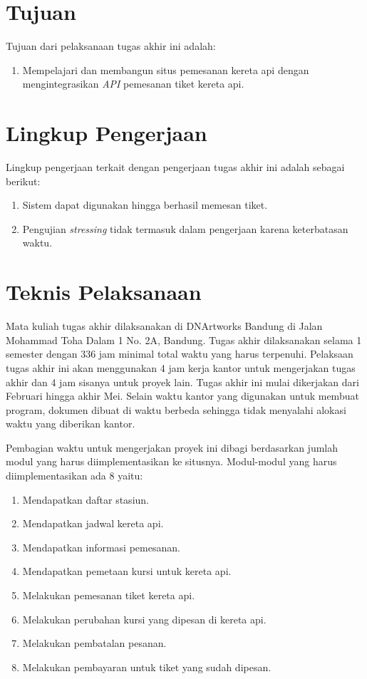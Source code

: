\section{Tujuan}
\label{sec:tujuan}
Tujuan dari pelaksanaan tugas akhir ini adalah:

\begin{enumerate}
	\item Mempelajari dan membangun situs pemesanan kereta api dengan mengintegrasikan \textit{API} pemesanan tiket kereta api.

\end{enumerate}

\section{Lingkup Pengerjaan}
\label{sec:lingkuppengerjaan}
Lingkup pengerjaan terkait dengan pengerjaan tugas akhir ini adalah sebagai berikut:
\begin{enumerate}
	\item Sistem dapat digunakan hingga berhasil memesan tiket.
	\item Pengujian \textit{stressing} tidak termasuk dalam pengerjaan karena keterbatasan waktu.
\end{enumerate}

\section{Teknis Pelaksanaan}
\label{sec:teknispelaksanaan}
Mata kuliah tugas akhir dilaksanakan di DNArtworks Bandung di Jalan Mohammad Toha Dalam 1 No. 2A, Bandung. Tugas akhir dilaksanakan selama 1 semester dengan 336 jam minimal total waktu yang harus terpenuhi. Pelaksaan tugas akhir ini akan menggunakan 4 jam kerja kantor untuk mengerjakan tugas akhir dan 4 jam sisanya untuk proyek lain. Tugas akhir ini mulai dikerjakan dari Februari hingga akhir Mei. Selain waktu kantor yang digunakan untuk membuat program, dokumen dibuat di waktu berbeda sehingga tidak menyalahi alokasi waktu yang diberikan kantor.

Pembagian waktu untuk mengerjakan proyek ini dibagi berdasarkan jumlah modul yang harus diimplementasikan ke situsnya. Modul-modul yang harus diimplementasikan ada 8 yaitu:

\begin{enumerate}
	\item Mendapatkan daftar stasiun.
	\item Mendapatkan jadwal kereta api.
	\item Mendapatkan informasi pemesanan.
	\item Mendapatkan pemetaan kursi untuk kereta api.
	\item Melakukan pemesanan tiket kereta api.
	\item Melakukan perubahan kursi yang dipesan di kereta api.
	\item Melakukan pembatalan pesanan.
	\item Melakukan pembayaran untuk tiket yang sudah dipesan.

\end{enumerate}

